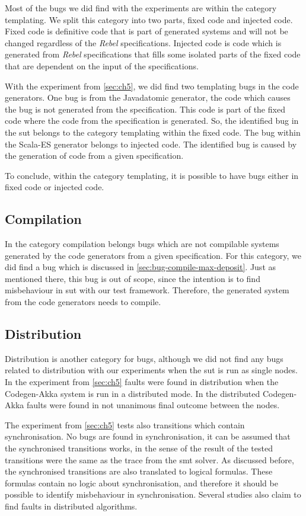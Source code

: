 Most of the bugs we did find with the experiments are within the category
templating. We split this category into two parts, fixed code and injected code.
Fixed code is definitive code that is part of generated systems and will not be
changed regardless of the \textit{Rebel} specifications.
Injected code is code which is generated from \textit{Rebel} specifications that
fills some isolated parts of the fixed code that are dependent on the input of
the specifications.

With the experiment from \autoref{sec:ch5}, we did find two templating bugs in the code
generators. One bug is from the Javadatomic generator, the code which causes the
bug is not generated from the specification. This code is part of the fixed code
where the code from the specification is generated. So, the identified bug in
the \gls{sut} belongs to the category templating within the fixed code.
The bug within the Scala-ES generator belongs to injected code. The identified bug is
caused by the generation of code from a given specification.

To conclude, within
the category templating, it is possible to have bugs either in fixed code or
injected code.

\subsection{Compilation}
In the category compilation belongs bugs which are not compilable systems
generated by the code generators from a given specification. For this category,
we did find a bug which is discussed in \autoref{sec:bug-compile-max-deposit}.
Just as mentioned there, this bug is out of scope, since the intention is to
find misbehaviour in \gls{sut} with our test framework.
Therefore, the generated system from the code generators needs to compile.


\subsection{Distribution}
Distribution is another category for bugs, although we did not find any bugs
related to distribution with our experiments when the \gls{sut} is run as single
nodes. In the experiment from \autoref{sec:ch5} faults were found in
distribution when the Codegen-Akka system is run in a distributed mode. In the
distributed Codegen-Akka faults were found in not unanimous final outcome
between the nodes.

The experiment from \autoref{sec:ch5} tests also transitions which contain
synchronisation. No bugs are found in synchronisation, it can be assumed that
the synchronised transitions works, in the sense of the result of the tested
transitions were the same as the trace from the \gls{smt} solver. As discussed
before, the synchronised transitions are also translated to logical formulas.
These formulas contain no logic about synchronisation, and therefore it should
be possible to identify misbehaviour in synchronisation. Several studies also
claim to find faults in distributed algorithms.
